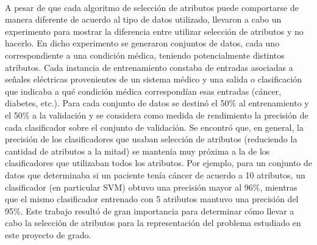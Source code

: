 \paragraph{}A pesar de que cada algoritmo de selección de atributos puede comportarse de manera diferente de acuerdo al tipo de datos utilizado, \citet{fs-survey} llevaron a cabo un experimento para mostrar la diferencia entre utilizar selección de atributos y no hacerlo. En dicho experimento se generaron conjuntos de datos, cada uno correspondiente a una condición médica, teniendo potencialmente distintos atributos. Cada instancia de entrenamiento constaba de entradas asociadas a señales eléctricas provenientes de un sistema médico y una salida o clasificación que indicaba a qué condición médica correspondían esas entradas (cáncer, diabetes, etc.). Para cada conjunto de datos se destinó el 50\% al entrenamiento y el 50\% a la validación y se considera como medida de rendimiento la precisión de cada clasificador sobre el conjunto de validación. Se encontró que, en general, la precisión de los clasificadores que usaban selección de atributos (reduciendo la cantidad de atributos a la mitad) se mantenía muy próxima a la de los clasificadores que utilizaban todos los atributos. Por ejemplo, para un conjunto de datos que determinaba si un paciente tenía cáncer de acuerdo a 10 atributos, un clasificador (en particular SVM) obtuvo una precisión mayor al 96\%, mientras que el mismo clasificador entrenado con 5 atributos mantuvo una precisión del 95\%.
Este trabajo resultó de gran importancia para determinar cómo llevar a cabo la selección de atributos para la representación del problema estudiado en este proyecto de grado.

